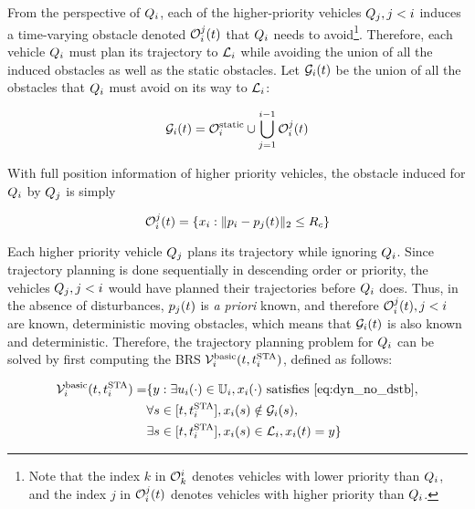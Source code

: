 From the perspective of $Q_i$, each of the higher-priority vehicles $Q_j, j<i$ induces a time-varying obstacle denoted $\mathcal{O}_i^j(t)$ that $Q_i$ needs to avoid\footnote{Note that the index $k$ in $\mathcal{O}_k^i$ denotes vehicles with lower priority than $Q_i$, and the index $j$ in $\mathcal{O}_i^j(t)$ denotes vehicles with higher priority than $Q_i$.}. Therefore, each vehicle $Q_i$ must plan its trajectory to $\mathcal{L}_i$ while avoiding the union of all the induced obstacles as well as the static obstacles. Let $\mathcal{G}_i(t)$ be the union of all the obstacles that $Q_i$ must avoid on its way to $\mathcal{L}_i$:

\begin{equation}
\label{eq:obsseti}
\obsset_i(t)  = \soset_i \cup \bigcup_{j=1}^{i-1} \ioset_i^j(t)
\end{equation}

With full position information of higher priority vehicles, the obstacle induced for $Q_i$ by $Q_j$ is simply

\begin{equation}
\label{eq:ioset}
\ioset_i^j(t) = \{\state_i: \|\pos_i - \pos_j(t)\|_2 \le \rc \}
\end{equation}

Each higher priority vehicle $Q_j$ plans its trajectory while ignoring $Q_i$. Since trajectory planning is done sequentially in descending order or priority, the vehicles $Q_j, j<i$ would have planned their trajectories before $Q_i$ does. Thus, in the absence of disturbances, $p_j(t)$ is \textit{a priori} known, and therefore $\mathcal{O}_i^j(t), j<i$ are known, deterministic moving obstacles, which means that $\mathcal{G}_i(t)$ is also known and deterministic. Therefore, the trajectory planning problem for $Q_i$ can be solved by first computing the BRS $\mathcal{V}_i^\text{basic}(t, t^\text{STA}_i)$, defined as follows:

\begin{equation}
\label{eq:BRS_basic}
\begin{aligned}
\brs_i^\text{basic}(t, \sta_i) = & \{y: \exists \ctrl_i(\cdot) \in \cfset_i, \state_i(\cdot) \text{ satisfies \eqref{eq:dyn_no_dstb}}, \\
& \forall s \in [t, \sta_i],\state_i(s) \notin \obsset_i(s), \\
& \exists s \in [t, \sta_i], \state_i(s) \in \targetset_i, \state_i(t) = y\}
\end{aligned}
\end{equation}

